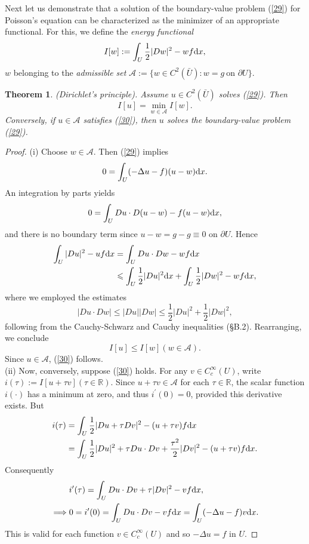 \documentclass[hyperref,UTF8,12pt]{article}
\numberwithin{equation}{subsection}
\theoremstyle{plain}
\newtheorem{theorem}{Theorem}
\theoremstyle{definition}
\numberwithin{theorem}{section}
\numberwithin{lemma}{section}
\numberwithin{proposition}{section}
\numberwithin{remark}{section}
\numberwithin{corollary}{section}
\numberwithin{definition}{section}
\numberwithin{problem}{section}
\numberwithin{example}{section}
\def\dif{\textup{d}}
\newcommand{\ptl}{\partial}
\newcommand{\mr}{\mathbb{R}}
\renewcommand{\leq}{\leqslant}
\begin{document}
Next let us demonstrate that a solution of the boundary-value problem (\ref{29}) for Poisson's equation can be characterized as the minimizer of an appropriate functional. For this, we define the \emph{energy functional}\[I[w]:=\int_U\frac{1}{2}|Dw|^2-wf\dif x,\]
$w$ belonging to the \emph{admissible set} $\mathcal{A}:=\{w\in C^2(\bar{U}):w=g~\text{on }\ptl U\}$.
\begin{theorem}
(Dirichlet's principle). Assume $u\in C^2(\bar{U})$ solves \emph{(\ref{29})}.
Then\[I[u]=\min_{w\in\mathcal{A}}I[w].\tag{30}\label{30}\]
Conversely, if $u\in\mathcal{A}$ satisfies \emph{(\ref{30})}, then $u$ solves the boundary-value problem \emph{(\ref{29})}.
\end{theorem}
\begin{proof}
(i) Choose $w \in \mathcal{A}$. Then (\ref{29}) implies\[0=\int_U(-\Delta u-f)(u-w)\dif x.\] An integration by parts yields\[0=\int_UDu\cdot D(u-w)-f(u-w)\dif x,\]and there is no boundary term since $u-w=g-g\equiv0$ on $\ptl U$. Hence\[\begin{aligned}
	\int_U|Du|^2-uf\dif x&=\int_UDu\cdot Dw-wf\dif x\\
	& \leq\int_U\frac{1}{2}|Du|^2\dif x+\int_U\frac{1}{2}|Dw|^2-wf\dif x,
\end{aligned}\]where we employed the estimates
\[|Du\cdot Dw|\leq|Du||Dw|\leq\frac{1}{2}|Du|^2+\frac{1}{2}|Dw|^2,\]
following from the Cauchy-Schwarz and Cauchy inequalities (§B.2). Rearranging, we conclude
\[I[u]\leq I[w](w\in\mathcal{A}).\]Since $u\in\mathcal{A}$, (\ref{30}) follows.\\
(ii) Now, conversely, suppose (\ref{30}) holds. For any $v\in C_c^\infty(U)$, write $i(\tau):=I[u+\tau v](\tau\in\mr)$. Since $u+\tau v\in\mathcal{A}$ for each $\tau\in\mr$, the scalar function $i(\cdot)$ has a minimum at zero, and thus $i^\prime(0)=0$,
provided this derivative exists. But\[\begin{aligned}
	i(\tau)&=\int_U\frac{1}{2}|Du+\tau Dv|^2-(u+\tau v)f\dif x \\
	& =\int_U\frac{1}{2}|D u|^2+\tau D u \cdot D v+\frac{\tau^2}{2}|D v|^2-(u+\tau v) f \dif x.
\end{aligned}\]
Consequently
\[\begin{aligned}
	&i^\prime(\tau)=\int_UDu\cdot Dv+\tau|Dv|^2-vf\dif x,\\
	\implies&0=i^\prime(0)=\int_UDu\cdot Dv-vf\dif x=\int_U(-\Delta u-f)v\dif x.
\end{aligned}\]
This is valid for each function $v\in C_c^\infty(U)$ and so $-\Delta u=f$ in $U$.
\end{proof}
\end{document}
